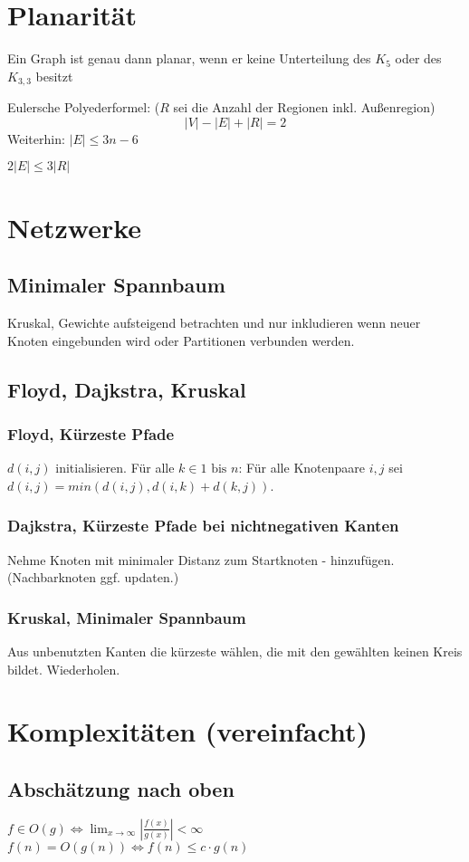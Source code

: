 \documentclass[10pt,a4paper]{article}
\newcommand{\abs}[1]{\ensuremath{\left\vert#1\right\vert}}
\begin{document}
\section{Planarität}
Ein Graph ist genau dann planar, wenn er keine Unterteilung des $K_5$ oder des $K_{3,3}$ besitzt

Eulersche Polyederformel: ($R$ sei die Anzahl der Regionen inkl. Außenregion)
\[|V|-|E|+|R|=2\]
Weiterhin: $|E| \leq 3n -6$

$2|E| \leq 3|R|$
\section{Netzwerke}
\subsection{Minimaler Spannbaum}
Kruskal, Gewichte aufsteigend betrachten und nur inkludieren wenn neuer Knoten eingebunden wird oder Partitionen verbunden werden.
\subsection{Floyd, Dajkstra, Kruskal}
\subsubsection{Floyd, Kürzeste Pfade}
$d(i,j)$ initialisieren. Für alle $k \in 1 \mbox{ bis } n$: Für alle Knotenpaare $i, j$ sei $d(i, j) = min (d(i,j), d(i,k) + d(k,j))$.
\subsubsection{Dajkstra, Kürzeste Pfade bei nichtnegativen Kanten}
Nehme Knoten mit minimaler Distanz zum Startknoten - hinzufügen. (Nachbarknoten ggf. updaten.)
\subsubsection{Kruskal, Minimaler Spannbaum}
Aus unbenutzten Kanten die kürzeste wählen, die mit den gewählten keinen Kreis bildet. Wiederholen.
\section{Komplexitäten (vereinfacht)}
\subsection{Abschätzung nach oben}
$f \in O(g) \Leftrightarrow \lim_{x \rightarrow \infty} \abs{\frac{f(x)}{g(x)}} < \infty $ \,\,\,\,\,\,\,\,\,\,\,\,\,\,\,\,\,\,\,\,\,\,\,\,\,\,\,\, $f(n) = O(g(n)) \Leftrightarrow f(n) \leq c \cdot g(n)$
\end{document}
